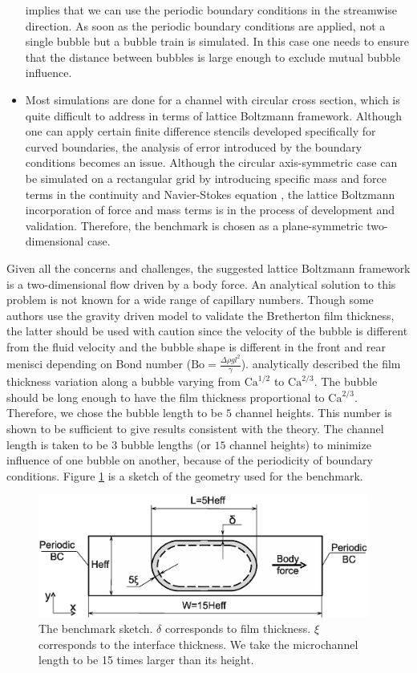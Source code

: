 \documentclass[preprint,12pt]{elsarticle}
\newcommand{\Ca}{\mathrm{Ca}}
\begin{document}
\begin{itemize}
implies that we can use the periodic boundary conditions in the streamwise direction. As soon as the
periodic boundary
conditions are applied, not a single bubble but a bubble train is simulated. In this case one
needs
to ensure that the distance between bubbles is large enough to exclude mutual bubble influence.
 \item Most simulations are done for a channel with circular cross section,
which is quite difficult to address in terms of lattice Boltzmann framework.
Although one can apply certain finite difference stencils
\cite{arnold-boundary,hunt-boundary} developed specifically for curved boundaries,
the analysis of error introduced by the boundary conditions becomes an issue. Although the circular
axis-symmetric case can be simulated on a rectangular grid by introducing specific mass and force
terms in the continuity and Navier-Stokes equation \cite{halliday-circular}, the lattice Boltzmann
incorporation of force and mass terms is in the process of development and validation. Therefore,
the benchmark is chosen as a plane-symmetric two-dimensional case.  
\end{itemize}
Given all the concerns and challenges, the suggested lattice Boltzmann framework
is a two-dimensional flow driven by a body force.  An analytical
solution to this problem is not known for a wide range of capillary
numbers.
Though some authors \cite{sehgal-microchannel} use the gravity driven model to
validate the Bretherton film thickness, the latter should be used with caution
since the velocity of the bubble is different from the fluid velocity and the
bubble shape
is different in the front and rear menisci depending on Bond number ($\mathrm{Bo}=\frac{\Delta \rho g
l^2}{\gamma}$). \citet{wong-films}
analytically described the film thickness variation along a bubble varying from $\Ca^{1/2}$ to
$\Ca^{2/3}$. The bubble should be long enough to have the film thickness proportional to
$\Ca^{2/3}$. Therefore, we chose the bubble length to be $5$ channel heights. This number is shown
to be sufficient to give results consistent with the theory. The
channel length is taken to be $3$ bubble lengths (or $15$ channel heights)
to minimize influence of one bubble on another,
because of the periodicity of boundary conditions.
Figure \ref{fig:benchmark:sketch} is a sketch of the geometry
used for the benchmark.
\begin{figure}
\includegraphics[width=0.97\textwidth]{Figures/benchmark_new.eps}
\caption{The benchmark sketch. $\delta$ corresponds to film thickness. $\xi$ corresponds to the interface thickness. We take the microchannel length to be 15 times larger than its height.
\label{fig:benchmark:sketch}}
\end{figure}
\end{document}
